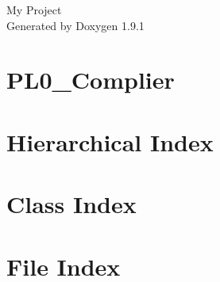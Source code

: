 \let\mypdfximage\pdfximage\def\pdfximage{\immediate\mypdfximage}\documentclass[twoside]{book}
\newcommand{\+}{\discretionary{\mbox{\scriptsize$\hookleftarrow$}}{}{}}
\newcommand{\clearemptydoublepage}{%
  \newpage{\pagestyle{empty}\cleardoublepage}%
}
\begin{document}
\raggedbottom

\hypersetup{pageanchor=false,
             bookmarksnumbered=true,
             pdfencoding=unicode
            }
\begin{titlepage}
\vspace*{7cm}
\begin{center}%
{\Large My Project }\\
\vspace*{1cm}
{\large Generated by Doxygen 1.9.1}\\
\end{center}
\end{titlepage}
\clearemptydoublepage
{}
\tableofcontents
\clearemptydoublepage
{}
\hypersetup{pageanchor=true}

\chapter{PL0\+\_\+\+Complier}
\label{md_README}

\chapter{Hierarchical Index}

\chapter{Class Index}

\chapter{File Index}

\end{document}

